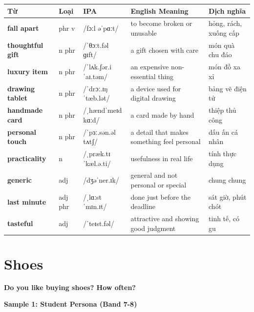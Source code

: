 \vspace{0.8em}
\begin{center}
\renewcommand{\arraystretch}{1.65}
\begin{tabularx}{\textwidth}{|V{0.22\textwidth}|C{0.07\textwidth}|I{0.20\textwidth}|Y|V{0.18\textwidth}|}
\hline
{}
\textbf{Từ} & \textbf{Loại} & \textbf{IPA} & \textbf{English Meaning} & \textbf{Dịch nghĩa} \\
\hline
\textbf{fall apart} & phr v & /fɔːl əˈpɑːt/ & to become broken or unusable & hỏng, rách, xuống cấp \\ \hline
\textbf{thoughtful gift} & n phr & /ˈθɔːt.fəl ɡɪft/ & a gift chosen with care & món quà chu đáo \\ \hline
\textbf{luxury item} & n phr & /ˈlʌk.ʃər.i ˈaɪ.təm/ & an expensive non-essential thing & món đồ xa xỉ \\ \hline
\textbf{drawing tablet} & n phr & /ˈdrɔː.ɪŋ ˈtæb.lət/ & a device used for digital drawing & bảng vẽ điện tử \\ \hline
\textbf{handmade card} & n phr & /ˌhændˈmeɪd kɑːd/ & a card made by hand & thiệp thủ công \\ \hline
\textbf{personal touch} & n phr & /ˈpɜː.sən.əl tʌtʃ/ & a detail that makes something feel personal & dấu ấn cá nhân \\ \hline
\textbf{practicality} & n & /ˌpræk.tɪˈkæl.ə.ti/ & usefulness in real life & tính thực dụng \\ \hline
\textbf{generic} & adj & /dʒəˈner.ɪk/ & general and not personal or special & chung chung \\ \hline
\textbf{last minute} & adj phr & /ˌlɑːst ˈmɪn.ɪt/ & done just before the deadline & sát giờ, phút chót \\ \hline
\textbf{tasteful} & adj & /ˈteɪst.fəl/ & attractive and showing good judgment & tinh tế, có gu \\ \hline
\end{tabularx}
\end{center}

\newpage

\section{Shoes}
\begin{ieltsquestion}
\textbf{Do you like buying shoes? How often?}
\end{ieltsquestion}
\textbf{Sample 1: Student Persona (Band 7-8)}

